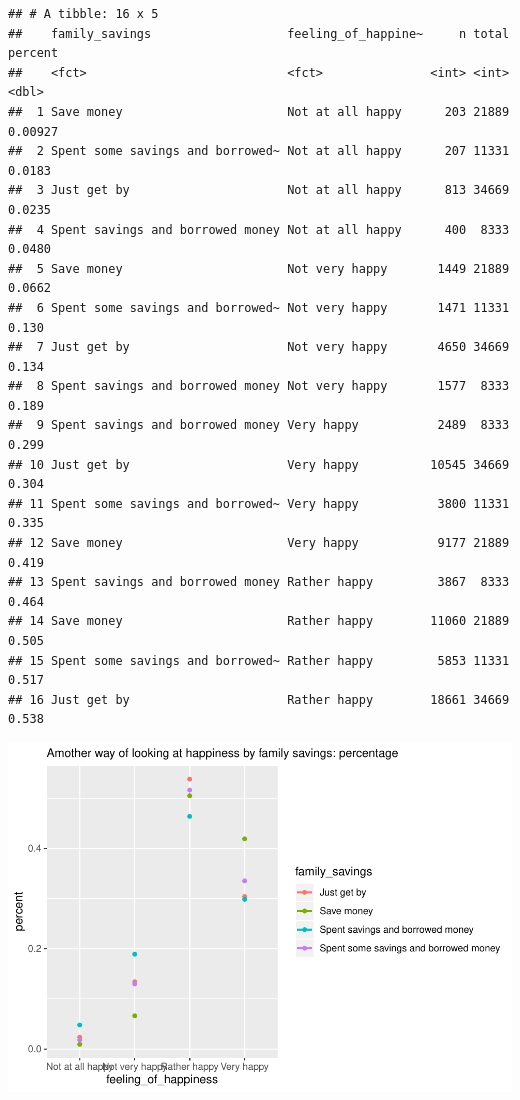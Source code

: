 \documentclass[man, fleqn, noextraspace,floatsintext]{apa6}
\begin{document}
\begin{verbatim}
## # A tibble: 16 x 5
##    family_savings                   feeling_of_happine~     n total percent
##    <fct>                            <fct>               <int> <int>   <dbl>
##  1 Save money                       Not at all happy      203 21889 0.00927
##  2 Spent some savings and borrowed~ Not at all happy      207 11331 0.0183 
##  3 Just get by                      Not at all happy      813 34669 0.0235 
##  4 Spent savings and borrowed money Not at all happy      400  8333 0.0480 
##  5 Save money                       Not very happy       1449 21889 0.0662 
##  6 Spent some savings and borrowed~ Not very happy       1471 11331 0.130  
##  7 Just get by                      Not very happy       4650 34669 0.134  
##  8 Spent savings and borrowed money Not very happy       1577  8333 0.189  
##  9 Spent savings and borrowed money Very happy           2489  8333 0.299  
## 10 Just get by                      Very happy          10545 34669 0.304  
## 11 Spent some savings and borrowed~ Very happy           3800 11331 0.335  
## 12 Save money                       Very happy           9177 21889 0.419  
## 13 Spent savings and borrowed money Rather happy         3867  8333 0.464  
## 14 Save money                       Rather happy        11060 21889 0.505  
## 15 Spent some savings and borrowed~ Rather happy         5853 11331 0.517  
## 16 Just get by                      Rather happy        18661 34669 0.538
\end{verbatim}

\includegraphics{610_final_files/figure-latex/happiness and family savings JW-3.pdf}
\end{document}
